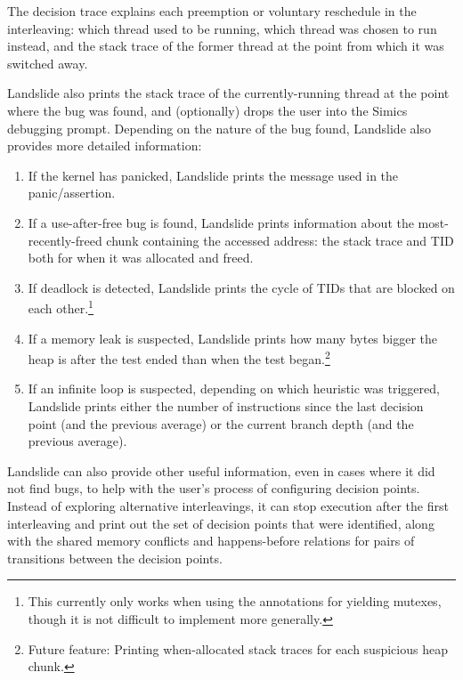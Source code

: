 The decision trace explains each preemption or voluntary reschedule in the interleaving: which thread used to be running, which thread was chosen to run instead, and the stack trace of the former thread at the point from which it was switched away.

Landslide also prints the stack trace of the currently-running thread at the point where the bug was found, and (optionally) drops the user into the Simics debugging prompt. Depending on the nature of the bug found, Landslide also provides more detailed information:

\begin{enumerate}
	\item If the kernel has panicked, Landslide prints the message used in the panic/assertion.
	\item If a use-after-free bug is found, Landslide prints information about the most-recently-freed chunk containing the accessed address: the stack trace and TID both for when it was allocated and freed.
	\item If deadlock is detected, Landslide prints the cycle of TIDs that are blocked on each other.\footnote{This currently only works when using the annotations for yielding mutexes, though it is not difficult to implement more generally.}
	\item If a memory leak is suspected, Landslide prints how many bytes bigger the heap is after the test ended than when the test began.\footnote{Future feature: Printing when-allocated stack traces for each suspicious heap chunk.}
	\item If an infinite loop is suspected, depending on which heuristic was triggered, Landslide prints either the number of instructions since the last decision point (and the previous average) or the current branch depth (and the previous average).
\end{enumerate}

Landslide can also provide other useful information, even in cases where it did not find bugs, to help with the user's process of configuring decision points. Instead of exploring alternative interleavings, it can stop execution after the first interleaving and print out the set of decision points that were identified, along with the shared memory conflicts and happens-before relations for pairs of transitions between the decision points.
